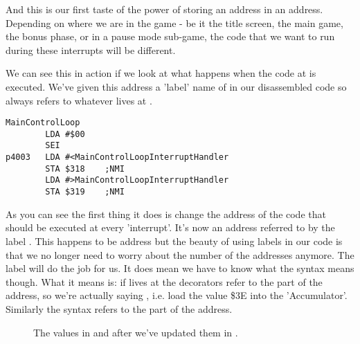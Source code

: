 And this is our first taste of the power of storing an address in an address. Depending on where we are in the game - be it the
title screen, the main game, the bonus phase, or in a pause mode sub-game, the code that we want to run during these interrupts
will be different.

We can see this in action if we look at what happens when the code at  is executed. We've given this address 
a 'label' name of  in our disassembled code so  always refers to whatever lives at
. 

\begin{lstlisting}[caption=The code at \icode{\$4000}. ]
MainControlLoop
        LDA #$00
        SEI
p4003   LDA #<MainControlLoopInterruptHandler
        STA $318    ;NMI
        LDA #>MainControlLoopInterruptHandler
        STA $319    ;NMI
\end{lstlisting}

As you can see the first thing it does is change the address of the code that should be executed at every 'interrupt'. It's now an
address referred to by the label . This happens to be address  but the beauty
of using labels in our code is that we no longer need to worry about the number of the addresses anymore. The label will do the job
for us. It does mean we have to know what the syntax  means though. What it means is:
if  lives at  the \icode{\#<} decorators refer to the  part of the
address, so we're actually saying , i.e. load the value \$3E into the 'Accumulator'. Similarly the syntax
 refers to the  part of the address.

\begin{figure}[H]
  {
    \setlength{\tabcolsep}{3.0pt}
    \setlength\cmidrulewidth{\heavyrulewidth} %
    \begin{adjustbox}{width=7cm,center}
    \end{adjustbox}
  }\caption{The values in  and  after we've updated them in .}
\end{figure}

